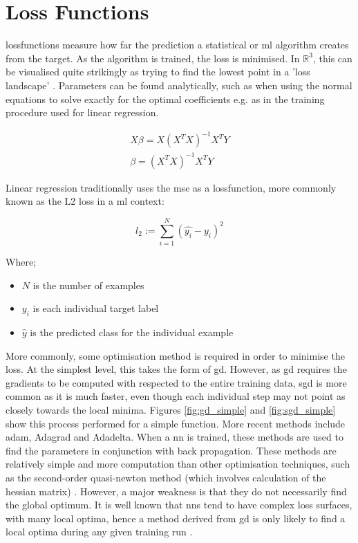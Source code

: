 \section{Loss Functions}

\gls{lossfunction}s measure how far the prediction a statistical or \gls{ml} algorithm creates from the target. As the algorithm is trained, the loss is minimised. In $\mathds{R}^3$, this can be visualised quite strikingly as trying to find the lowest point in a 'loss landscape' \cite{loss_landscape}. Parameters can be found analytically, such as when using the normal equations to solve exactly for the optimal coefficients e.g. as in the training procedure used for linear regression.
\bigskip

\begin{align*}
    \hat{X\beta} = X(X^TX)^{-1}X^TY \\
    \beta = (X^TX)^{-1}X^TY
\end{align*}

Linear regression traditionally uses the  \gls{mse} as a \gls{lossfunction}, more commonly known as the L2 loss in a \gls{ml} context:

\begin{equation}
l_2 := \sum_{i = 1}^N (\hat{y_i} - y_i)^2
\end{equation}

Where;

\begin{itemize}
\item $N$ is the number of examples  
\item $y_i$ is each individual target label  
\item $\hat{y}$ is the predicted class for the individual example 
\end{itemize}

More commonly, some optimisation method is required in order to minimise the \gls{loss}.  At the simplest level, this takes the form of \gls{gd}. However, as \gls{gd} requires the gradients to be computed with respected to the entire training data, \gls{sgd} is more common as it is much faster, even though each individual step may not point as closely towards the local minima. Figures  \ref{fig:gd_simple} and \ref{fig:sgd_simple} show this process performed for a simple function. More recent methods include  \gls{adam}, Adagrad and Adadelta. When a \gls{nn} is trained, these methods are used to find the parameters in conjunction with back propagation. These methods are relatively simple and more computation than other optimisation techniques, such as the second-order quasi-newton method (which involves calculation of the hessian matrix) \cite{quasi_netwon}. However, a major weakness is that they do not necessarily find the global optimum. It is well known that \gls{nn}s tend to have complex loss surfaces, with many local optima, hence a method derived from \gls{gd} is only likely to find a local optima during any given training run \cite{gd_optima}.   

